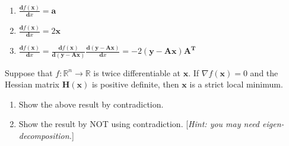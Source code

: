 \begin{solution}
	\heiti
	\ \\
	\begin{enumerate}
		\item $\frac{\mathbf{d}f(\mathbf{x})}{\mathbf{d}x} = \mathbf{a}$
		\item $\frac{\mathbf{d}f(\mathbf{x})}{\mathbf{d}x} = 2\mathbf{x}$
		\item $\frac{\mathbf{d}f(\mathbf{x})}{\mathbf{d}x} = \frac{\mathbf{d}f(\mathbf{x})}{\mathbf{d}(\mathbf{y} - \mathbf{A}\mathbf{x})} \frac{\mathbf{d}(\mathbf{y} - \mathbf{A}\mathbf{x})}{\mathbf{d}x} = - 2(\mathbf{y} - \mathbf{A}\mathbf{x})\mathbf{A}^\mathbf{T}$
	\end{enumerate}
\end{solution}
\newpage


\begin{exercise}
	Suppose that $f:\mathbb{R}^n\rightarrow\mathbb{R}$ is twice differentiable at $\mathbf{x}$. If $\nabla f(\mathbf{x})=0$ and the Hessian matrix $\mathbf{H}(\mathbf{x})$ is positive definite, then $\mathbf{x}$ is a strict local minimum.
	\begin{enumerate}
		\item Show the above result by contradiction.
		\item Show the result by NOT using contradiction. [\emph{Hint: you may need eigen-decomposition.}]
	\end{enumerate}
\end{exercise}

